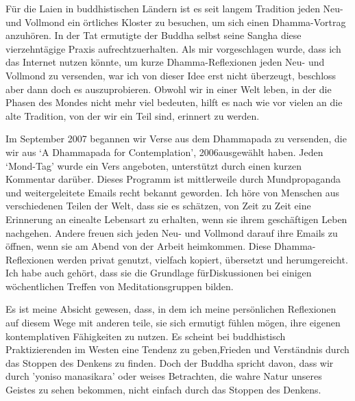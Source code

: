Für die Laien in buddhistischen Ländern ist es seit langem
Tradition\linebreak 
jeden Neu- und Vollmond ein örtliches Kloster
zu besuchen, um sich\linebreak 
einen Dhamma-Vortrag anzuhören. 
In der Tat ermutigte der Buddha selbst seine Sangha
diese vierzehntägige Praxis aufrechtzuerhalten. 
Als mir vorgeschlagen wurde, dass ich das Internet nutzen könnte, 
um kurze Dhamma-Reflexionen jeden Neu- und
Vollmond zu versenden, war ich von dieser Idee erst nicht
überzeugt, beschloss aber dann doch es
auszuprobieren.
Obwohl wir in einer Welt leben, in der die Phasen des Mondes nicht mehr viel bedeuten, hilft es nach wie vor vielen an die alte Tradition, von der wir ein Teil sind, erinnert zu werden.

Im September 2007 begannen wir Verse aus dem
Dhammapada zu versenden, die wir aus `A Dhammapada for Contemplation', 2006\linebreak ausgewählt haben. Jeden `Mond-Tag' wurde ein Vers angeboten, unter\-stützt durch
einen kurzen Kommentar darüber.
Dieses Programm ist
mittlerweile durch Mundpropaganda und weitergeleitete
Emails recht bekannt geworden. 
Ich höre von Menschen
aus verschiedenen Teilen der Welt, dass sie es schätzen,
von Zeit zu Zeit eine Erinnerung an eine\linebreak alte Lebensart zu
erhalten, wenn sie ihrem geschäftigen Leben nach\-gehen.
Andere freuen sich jeden Neu- und Vollmond darauf ihre Emails zu öﬀnen, wenn sie am Abend von der Arbeit heimkommen. 
Diese Dhamma-Reflexionen werden
privat genutzt, vielfach kopiert, übersetzt und herum\-gereicht. Ich habe auch gehört, dass sie die Grund\-lage für\linebreak Diskussionen bei einigen wöchentlichen Treﬀen von Meditations\-gruppen bilden.

Es ist meine Absicht gewesen, dass, in dem ich meine persönlichen Reﬂexionen auf diesem Wege mit anderen teile, sie sich ermutigt fühlen mögen, ihre eigenen kontemplativen Fähigkeiten zu nutzen.
Es scheint bei buddhistisch Praktizierenden im Westen eine Tendenz zu geben,\linebreak Frieden und Verständnis durch das
Stoppen des Denkens zu ﬁnden. Doch der Buddha spricht
davon, dass wir durch ’yoniso manasikara’ oder weises Betrachten, die wahre Natur unseres Geistes zu sehen bekommen, nicht einfach durch das Stoppen des Denkens.

